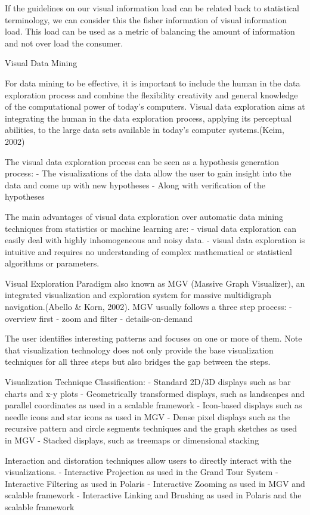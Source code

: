 \documentclass[print]{nuthesis}
\begin{document}
If the guidelines on our visual information load can be related back to statistical terminology, we can consider this the fisher information of visual information load. This load can be used as a metric of balancing the amount of information and not over load the consumer.

Visual Data Mining

For data mining to be effective, it is important to include the human in the data exploration process and combine the flexibility creativity and general knowledge of the computational power of today's computers. Visual data exploration aims at integrating the human in the data exploration process, applying its perceptual abilities, to the large data sets available in today's computer systems.(Keim, 2002)

The visual data exploration process can be seen as a hypothesis generation process:
- The visualizations of the data allow the user to gain insight into the data and come up with new hypotheses
- Along with verification of the hypotheses

The main advantages of visual data exploration over automatic data mining techniques from statistics or machine learning are:
- visual data exploration can easily deal with highly inhomogeneous and noisy data.
- visual data exploration is intuitive and requires no understanding of complex mathematical or statistical algorithms or parameters.

Visual Exploration Paradigm also known as MGV (Massive Graph Visualizer), an integrated visualization and exploration system for massive multidigraph navigation.(Abello \& Korn, 2002). MGV usually follows a three step process:
- overview first
- zoom and filter
- details-on-demand

The user identifies interesting patterns and focuses on one or more of them. Note that visualization technology does not only provide the base visualization techniques for all three steps but also bridges the gap between the steps.

Visualization Technique Classification:
- Standard 2D/3D displays such as bar charts and x-y plots
- Geometrically transformed displays, such as landscapes and parallel coordinates as used in a scalable framework
- Icon-based displays such as needle icons and star icons as used in MGV
- Dense pixel displays such as the recursive pattern and circle segments techniques and the graph sketches as used in MGV
- Stacked displays, such as treemaps or dimensional stacking

Interaction and distoration techniques allow users to directly interact with the visualizations.
- Interactive Projection as used in the Grand Tour System
- Interactive Filtering as used in Polaris
- Interactive Zooming as used in MGV and scalable framework
- Interactive Linking and Brushing as used in Polaris and the scalable framework
\end{document}
